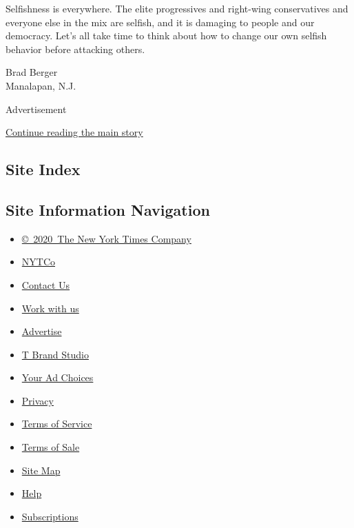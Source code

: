 Selfishness is everywhere. The elite progressives and right-wing
conservatives and everyone else in the mix are selfish, and it is
damaging to people and our democracy. Let's all take time to think about
how to change our own selfish behavior before attacking others.

Brad Berger\\
Manalapan, N.J.

Advertisement

\protect\hyperlink{after-bottom}{Continue reading the main story}

\hypertarget{site-index}{%
\subsection{Site Index}\label{site-index}}

\hypertarget{site-information-navigation}{%
\subsection{Site Information
Navigation}\label{site-information-navigation}}

\begin{itemize}
\tightlist
\item
  \href{https://help.nytimes3xbfgragh.onion/hc/en-us/articles/115014792127-Copyright-notice}{©~2020~The
  New York Times Company}
\end{itemize}

\begin{itemize}
\tightlist
\item
  \href{https://www.nytco.com/}{NYTCo}
\item
  \href{https://help.nytimes3xbfgragh.onion/hc/en-us/articles/115015385887-Contact-Us}{Contact
  Us}
\item
  \href{https://www.nytco.com/careers/}{Work with us}
\item
  \href{https://nytmediakit.com/}{Advertise}
\item
  \href{http://www.tbrandstudio.com/}{T Brand Studio}
\item
  \href{https://www.nytimes3xbfgragh.onion/privacy/cookie-policy\#how-do-i-manage-trackers}{Your
  Ad Choices}
\item
  \href{https://www.nytimes3xbfgragh.onion/privacy}{Privacy}
\item
  \href{https://help.nytimes3xbfgragh.onion/hc/en-us/articles/115014893428-Terms-of-service}{Terms
  of Service}
\item
  \href{https://help.nytimes3xbfgragh.onion/hc/en-us/articles/115014893968-Terms-of-sale}{Terms
  of Sale}
\item
  \href{https://spiderbites.nytimes3xbfgragh.onion}{Site Map}
\item
  \href{https://help.nytimes3xbfgragh.onion/hc/en-us}{Help}
\item
  \href{https://www.nytimes3xbfgragh.onion/subscription?campaignId=37WXW}{Subscriptions}
\end{itemize}
